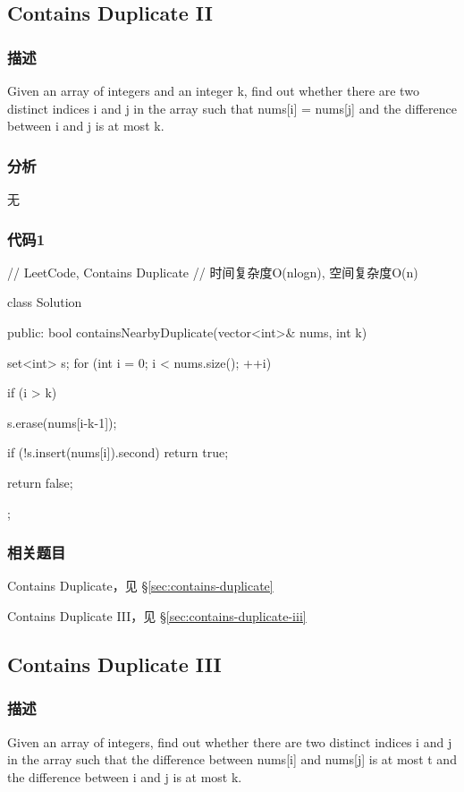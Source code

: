 \subsection{Contains Duplicate II}
\label{sec:containd-duplicate-ii}


\subsubsection{描述}
Given an array of integers and an integer k, find out whether there are two distinct indices i and j in the array such that nums[i] = nums[j] and the difference between i and j is at most k.

\subsubsection{分析}
无


\subsubsection{代码1}
\begin{Code}
// LeetCode, Contains Duplicate
// 时间复杂度O(nlogn), 空间复杂度O(n)

class Solution {
    public:
    bool containsNearbyDuplicate(vector<int>& nums, int k) {
        set<int> s;
        for (int i = 0; i < nums.size(); ++i) {
            if (i > k) {
                s.erase(nums[i-k-1]);

            }
            if (!s.insert(nums[i]).second) {
                return true;
            }
        }
        return false;
    }
};

\end{Code}


\subsubsection{相关题目}

\begindot
\item Contains Duplicate，见 \S \ref{sec:contains-duplicate}
\item Contains Duplicate III，见 \S \ref{sec:contains-duplicate-iii}
\myenddot

\subsection{Contains Duplicate III}
\label{sec:containd-duplicate-iii}


\subsubsection{描述}
Given an array of integers, find out whether there are two distinct indices i and j in the array such that the difference between nums[i] and nums[j] is at most t and the difference between i and j is at most k.

